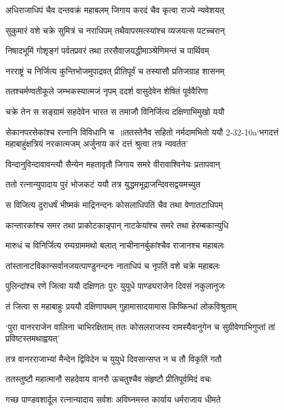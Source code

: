 \twolineshloka
{अधिराजाधिपं चैव दन्तवक्रं महाबलम्}
{जिगाय करदं चैव कृत्वा राज्ये न्यवेशयत्}


\twolineshloka
{सुकुमारं वशे चक्रे सुमित्रं च नराधिपम्}
{तथैवापरमत्स्यांश्च व्यजयत्स पटच्चरान्}


\twolineshloka
{निषादभूमिं गोशृङ्गं पर्वतप्रवरं तथा}
{तरसैवाजयद्धीमाञ्श्रेणिमन्तं च पार्थिवम्}


\twolineshloka
{नरराष्ट्रं च निर्जित्य कुन्तिभोजमुपाद्रवत्}
{प्रीतिपूर्वं च तस्यासौ प्रतिजग्राह शासनम्}


\twolineshloka
{ततश्चर्मण्वतीकूले जम्भकस्यात्मजं नृपम्}
{ददर्श वासुदेवेन शेषितं पूर्ववैरिणा}


\twolineshloka
{चक्रे तेन स सङ्ग्रामं सहदेवेन भारत}
{स तमाजौ विनिर्जित्य दक्षिणाभिमुखो ययौ}


\threelineshloka
{सेकानपरसेकांश्च रत्नानि विविधानि च ॥ततस्तेनैव सहितो नर्मदामभितो ययौ}
{2-32-10a`भगदत्तं महाबाहुंक्षत्रियं नरकात्मजम्}
{अर्जुनाय करं दत्तं श्रुत्वा तत्र न्यवर्तत'}


\twolineshloka
{विन्दानुविन्दावावन्त्यौ सैन्येन महतावृतौ}
{जिगाय समरे वीरावाश्विनेयः प्रतापवान्}


\twolineshloka
{ततो रत्नान्युपादाय पुरं भोजकटं ययौ}
{तत्र युद्धमभूद्राजन्दिवसद्वयमच्युत}


\twolineshloka
{स विजित्य दुराधर्षं भीष्मकं माद्रिनन्दनः}
{कोसलाधिपतिं चैव तथा वेणातटाधिपम्}


\twolineshloka
{कान्तारकांश्च समर तथा प्राकोटकान्नृपान्}
{नाटकेयांश्च समरे तथा हेरम्बकान्युधि}


\twolineshloka
{मारुधं च विनिर्जित्य रम्यग्राममथो बलात्}
{नाचीनानर्बुकांश्चैव राजानश्च महाबलः}


\twolineshloka
{तांस्तानाटविकान्सर्वानजयत्पाण्डुनन्दनः}
{नाताधिपं च नृपतिं वशे चक्रे महाबलः}


\twolineshloka
{पुलिन्दांश्च रणे जित्वा ययौ दक्षिणतः पुरः}
{युयुधे पाण्ड्यराजेन दिवसं नकुलानुजः}


\twolineshloka
{तं जित्वा स महाबाहुः प्रययौ दक्षिणापथम्}
{गुहामासादयामास किष्किन्धां लोकविश्रुताम्}


\threelineshloka
{`पुरा वानरराजेन वालिना चाभिरक्षिताम्}
{ततः कोसलराजस्य रामस्यैवानुगेन च}
{सुग्रीवेणाभिगुप्तां तां प्रविष्टस्तमथाह्वयत्'}


\twolineshloka
{तत्र वानरराजाभ्यां मैन्देन द्विविदेन च}
{युयुधे दिवसान्सप्त न च तौ विकृतिं गतौ}


\twolineshloka
{ततस्तुष्टौ महात्मानौ सहदेवाय वानरौ}
{ऊचतुश्चैव संहृष्टौ प्रीतिपूर्वमिदं वचः}


\twolineshloka
{गच्छ पाण्डवशार्दूल रत्नान्यादाय सर्वशः}
{अविघ्नमस्त कार्याय धर्मराजाय धीमते}


